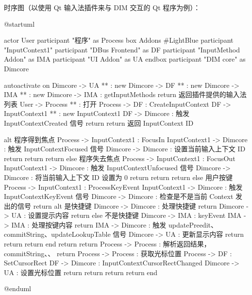 \documentclass{utart}
\begin{document}
        \pagebreak
        \par 时序图（以使用 Qt 输入法插件来与 DIM 交互的 Qt 程序为例）：

        \begin{plantuml}
        @startuml

        actor User
        participant "程序" as Process
        box Addons #LightBlue
        participant "InputContext1"
        participant "DBus Frontend" as DF
        participant "InputMethod Addon" as IMA
        participant "UI Addon" as UA
        endbox
        participant "DIM core" as Dimcore

        autoactivate on
        Dimcore -> UA ** : new
        Dimcore -> DF ** : new
        Dimcore -> IMA ** : new
        Dimcore -> IMA : getInputMethods
        return 返回插件提供的输入法列表
        User -> Process ** : 打开
        Process -> DF : CreateInputContext
        DF -> InputContext1 ** : new InputContext1
        DF -> Dimcore : 触发 InputContextCreated 信号
        return
        return 返回 InputContext ID

        alt 程序得到焦点
            Process -> InputContext1 : FocusIn
                InputContext1 -> Dimcore : 触发 InputContextFocused 信号
                    Dimcore -> Dimcore : 设置当前输入上下文 ID
                    return
                return
            return
        else 程序失去焦点
            Process -> InputContext1 : FocusOut
                InputContext1 -> Dimcore : 触发 InputContextUnfocused 信号
                    Dimcore -> Dimcore : 将当前输入上下文 ID 设置为 0
                    return
                return
            return
        else 用户按键
            Process -> InputContext1 : ProcessKeyEvent
                InputContext1 -> Dimcore : 触发 InputContextKeyEvent 信号
                    Dimcore -> Dimcore : 检查是不是当前 Context 发出的信号
                    return
                    alt 是快捷键
                        Dimcore -> Dimcore : 处理快捷键
                        return
                        Dimcore -> UA : 设置提示内容
                        return
                    else 不是快捷键
                        Dimcore -> IMA : keyEvent
                            IMA -> IMA : 处理按键内容
                            return
                            IMA -> Dimcore : 触发 updatePreedit、commitString、updateLookupTable 信号
                                Dimcore -> UA : 更新显示内容
                                return
                            return
                        return
                    end
                return
            return
            Process -> Process : 解析返回结果， commitString、\nupdatePreedit、\nforwardKey
            return
            Process -> Process : 获取光标位置
                Process -> DF : SetCursorRect
                    DF -> Dimcore : InputContextCursorRectChanged
                        Dimcore -> UA : 设置光标位置
                        return
                    return
                return
            return
        end

        @enduml
        \end{plantuml}
\end{document}

